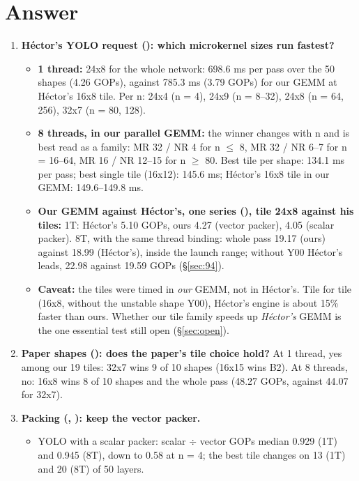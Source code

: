 \section*{Answer}
\begin{enumerate}\setlength\itemsep{4pt}
\item \textbf{H\'ector's YOLO request (): which microkernel sizes run fastest?}
  \begin{itemize}\setlength\itemsep{1pt}
  \item \textbf{1 thread:} 24x8 for the whole network: 698.6 ms per pass over the 50 shapes (4.26 GOPs), against 785.3 ms (3.79 GOPs) for our GEMM at H\'ector's 16x8 tile. Per n: 24x4 (n = 4), 24x9 (n = 8--32), 24x8 (n = 64, 256), 32x7 (n = 80, 128).
  \item \textbf{8 threads, in our parallel GEMM:} the winner changes with n and is best read as a family: MR 32 / NR 4 for n $\le$ 8, MR 32 / NR 6--7 for n = 16--64, MR 16 / NR 12--15 for n $\ge$ 80. Best tile per shape: 134.1 ms per pass; best single tile (16x12): 145.6 ms; H\'ector's 16x8 tile in our GEMM: 149.6--149.8 ms.
  \item \textbf{Our GEMM against H\'ector's, one series (), tile 24x8 against his tiles:} 1T: H\'ector's 5.10 GOPs, ours 4.27 (vector packer), 4.05 (scalar packer). 8T, with the same thread binding: whole pass 19.17 (ours) against 18.99 (H\'ector's), inside the launch range; without Y00 H\'ector's leads, 22.98 against 19.59 GOPs (\S\ref{sec:94}).
  \item \textbf{Caveat:} the tiles were timed in \emph{our} GEMM, not in H\'ector's. Tile for tile (16x8, without the unstable shape Y00), H\'ector's engine is about 15\% faster than ours. Whether our tile family speeds up \emph{H\'ector's} GEMM is the one essential test still open (\S\ref{sec:open}).
  \end{itemize}
\item \textbf{Paper shapes (): does the paper's tile choice hold?} At 1 thread, yes among our 19 tiles: 32x7 wins 9 of 10 shapes (16x15 wins B2). At 8 threads, no: 16x8 wins 8 of 10 shapes and the whole pass (48.27 GOPs, against 44.07 for 32x7).
\item \textbf{Packing (, ): keep the vector packer.}
  \begin{itemize}\setlength\itemsep{1pt}
  \item YOLO with a scalar packer: scalar $\div$ vector GOPs median 0.929 (1T) and 0.945 (8T), down to 0.58 at n = 4; the best tile changes on 13 (1T) and 20 (8T) of 50 layers.

\end{itemize}
\end{enumerate}
